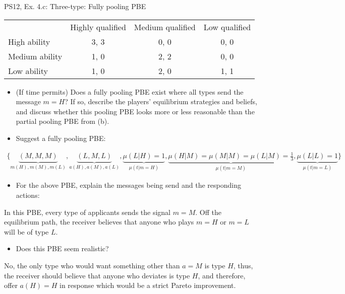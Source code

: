 \begin{frame}{PS12, Ex. 4.c: Three-type: Fully pooling PBE}
    \begin{table}
      \begin{tabular}{l|c|c|c|}
          \multicolumn{1}{c}{} & \multicolumn{1}{c}{Highly qualified} & \multicolumn{1}{c}{Medium qualified} & \multicolumn{1}{c}{Low qualified} \\\cline{2-4}
          High ability   & 3, 3 & 0, 0 & 0, 0 \\\cline{2-4}
          Medium ability & 1, 0 & 2, 2 & 0, 0 \\\cline{2-4}
          Low ability    & 1, 0 & 2, 0 & 1, 1 \\\cline{2-4}
      \end{tabular}
    \end{table}\vspace{-8pt}
    \begin{itemize}
      \item[(c)] (If time permits) Does a fully pooling PBE exist where all types send the message $m = H$? If so, describe the players’ equilibrium strategies and beliefs, and discuss whether this pooling PBE looks more or less reasonable than the partial pooling PBE from (b).
      \item[Step 1:] Suggest a fully pooling PBE:
    \end{itemize}\vspace{-12pt}
    \begin{align*}
      \{\underbrace{(M,M,M)}_{m(H),m(M),m(L)},\underbrace{(L,M,L)}_{a(H),a(M),a(L)},\underbrace{\mu(L|H)=1}_{\mu(t|m=H)},\underbrace{\mu(H|M)=\mu(M|M)=\mu(L|M)=\frac{1}{3}}_{\mu(t|m=M)},\underbrace{\mu(L|L)=1}_{\mu(t|m=L)}\}
    \end{align*}\vspace{-14pt}
    \begin{itemize}
        \item[Step 2:] For the above PBE, explain the messages being send and the responding actions:
    \end{itemize}\vspace{-2pt}
    In this PBE, every type of applicants sends the signal $m=M$. Off the equilibrium path, the receiver believes that anyone who plays $m=H$ or $m=L$ will be of type $L$.\vspace{-2pt}
    \begin{itemize}
        \item[Step 3:] Does this PBE seem realistic?
    \end{itemize}\vspace{-2pt}
    No, the only type who would want something other than $a=M$ is type $H$, thus, the receiver should believe that anyone who deviates is type $H$, and therefore, offer $a(H)=H$ in response which would be a strict Pareto improvement.
    \vfill\null
\end{frame}
